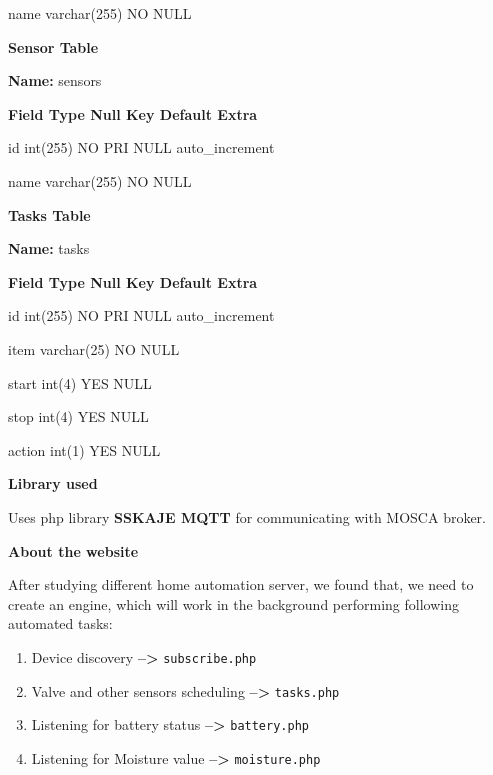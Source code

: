\documentclass[16pt]{article}
\begin{document}
name \textbar{} varchar(255) \textbar{} NO \textbar{} \textbar{} NULL
\textbar{} \textbar{}

\textbf{Sensor Table}

\textbf{Name:} sensors

\textbf{\textbar{} Field \textbar{} Type \textbar{} Null \textbar{} Key
\textbar{} Default \textbar{} Extra \textbar{}}

id \textbar{} int(255) \textbar{} NO \textbar{} PRI \textbar{} NULL
\textbar{} auto\_increment \textbar{}

name \textbar{} varchar(255) \textbar{} NO \textbar{} \textbar{} NULL
\textbar{}

\textbf{Tasks Table}

\textbf{Name:} tasks

\textbf{\textbar{} Field \textbar{} Type \textbar{} Null \textbar{} Key
\textbar{} Default \textbar{} Extra \textbar{}}

id \textbar{} int(255) \textbar{} NO \textbar{} PRI \textbar{} NULL
\textbar{} auto\_increment \textbar{}

item \textbar{} varchar(25) \textbar{} NO \textbar{} \textbar{} NULL
\textbar{} \textbar{}

start \textbar{} int(4) \textbar{} YES \textbar{} \textbar{} NULL
\textbar{} \textbar{}

stop \textbar{} int(4) \textbar{} YES \textbar{} \textbar{} NULL
\textbar{} \textbar{}

action \textbar{} int(1) \textbar{} YES \textbar{} \textbar{} NULL
\textbar{}


\textbf{Library used}

Uses php library \textbf{SSKAJE MQTT} for communicating with MOSCA
broker.



\textbf{About the website}

After studying different home automation server, we found that, we need
to create an engine, which will work in the background performing
following automated tasks:

\begin{enumerate}

\item Device discovery \textbf{--\textgreater{}}
\texttt{subscribe.php}
\item Valve and other sensors scheduling
\textbf{--\textgreater{}} \texttt{tasks.php} 
\item Listening for battery status \textbf{--\textgreater{}} \texttt{battery.php} 
\item Listening for Moisture value \textbf{--\textgreater{}} \texttt{moisture.php}

\end{enumerate}
\end{document}
